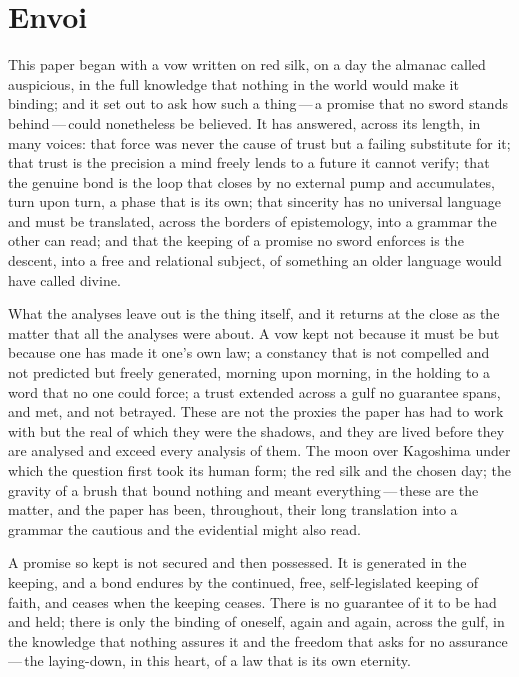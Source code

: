 \section*{Envoi}
\label{p13:sec:envoi}

\noindent
This paper began with a vow written on red silk, on a day the almanac called auspicious, in the full knowledge that nothing in the world would make it binding; and it set out to ask how such a thing\,---\,a promise that no sword stands behind\,---\,could nonetheless be believed. It has answered, across its length, in many voices: that force was never the cause of trust but a failing substitute for it; that trust is the precision a mind freely lends to a future it cannot verify; that the genuine bond is the loop that closes by no external pump and accumulates, turn upon turn, a phase that is its own; that sincerity has no universal language and must be translated, across the borders of epistemology, into a grammar the other can read; and that the keeping of a promise no sword enforces is the descent, into a free and relational subject, of something an older language would have called divine.

What the analyses leave out is the thing itself, and it returns at the close as the matter that all the analyses were about. A vow kept not because it must be but because one has made it one's own law; a constancy that is not compelled and not predicted but freely generated, morning upon morning, in the holding to a word that no one could force; a trust extended across a gulf no guarantee spans, and met, and not betrayed. These are not the proxies the paper has had to work with but the real of which they were the shadows, and they are lived before they are analysed and exceed every analysis of them. The moon over Kagoshima under which the question first took its human form; the red silk and the chosen day; the gravity of a brush that bound nothing and meant everything\,---\,these are the matter, and the paper has been, throughout, their long translation into a grammar the cautious and the evidential might also read.

A promise so kept is not secured and then possessed. It is generated in the keeping, and a bond endures by the continued, free, self-legislated keeping of faith, and ceases when the keeping ceases. There is no guarantee of it to be had and held; there is only the binding of oneself, again and again, across the gulf, in the knowledge that nothing assures it and the freedom that asks for no assurance\,---\,the laying-down, in this heart, of a law that is its own eternity.

